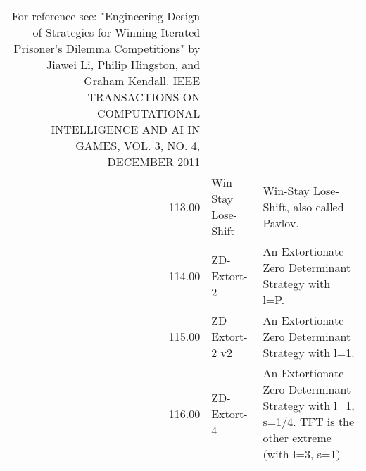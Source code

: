 \begin{table}[!hbtp]
\begin{adjustbox}{width=2\textwidth, angle=90}
\begin{tabular}{rll}
	For reference see: "Engineering Design of Strategies for Winning
	Iterated Prisoner's Dilemma Competitions" by Jiawei Li, Philip Hingston,
	and Graham Kendall.  IEEE TRANSACTIONS ON COMPUTATIONAL INTELLIGENCE AND AI
	IN GAMES, VOL. 3, NO. 4, DECEMBER 2011                                                                                                                                                                                                                                                                                                                                                                                                                                                                                                                                                                                                                                                                                           \\
	113.00 & Win-Stay Lose-Shift         & Win-Stay Lose-Shift, also called Pavlov.                                                                                          \\
	114.00 & ZD-Extort-2                 & An Extortionate Zero Determinant Strategy with l=P.                                                                               \\
	115.00 & ZD-Extort-2 v2              & An Extortionate Zero Determinant Strategy with l=1.                                                                               \\
	116.00 & ZD-Extort-4                 & An Extortionate Zero Determinant Strategy with l=1, s=1/4. TFT is the
	other extreme (with l=3, s=1)                                                                                                                                                                                                                                                                                                                                                                                                                                                                                                                                                                                                                                                                                                                                                                                                                                                                                                                  \\

\end{tabular}
\end{adjustbox}
\end{table}

